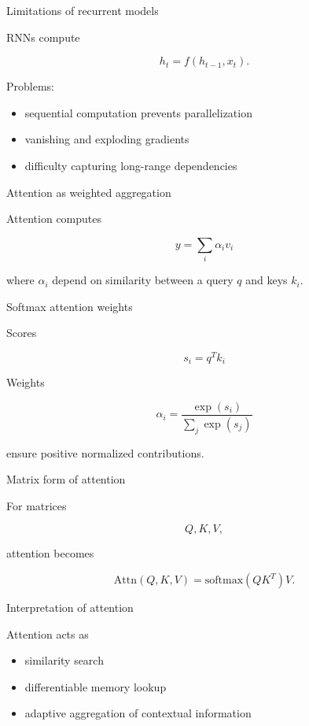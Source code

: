\documentclass[aspectratio=169]{beamer}
\begin{document}
\begin{frame}{Limitations of recurrent models}

RNNs compute

\[
h_t = f(h_{t-1},x_t).
\]

Problems:

\begin{itemize}
\item sequential computation prevents parallelization
\item vanishing and exploding gradients
\item difficulty capturing long-range dependencies
\end{itemize}

\end{frame}


\begin{frame}{Attention as weighted aggregation}

Attention computes

\[
y = \sum_i \alpha_i v_i
\]

where $\alpha_i$ depend on similarity between a query $q$
and keys $k_i$.

\end{frame}


\begin{frame}{Softmax attention weights}

Scores

\[
s_i = q^T k_i
\]

Weights

\[
\alpha_i = \frac{\exp(s_i)}{\sum_j \exp(s_j)}
\]

ensure positive normalized contributions.

\end{frame}


\begin{frame}{Matrix form of attention}

For matrices

\[
Q,K,V,
\]

attention becomes

\[
\text{Attn}(Q,K,V) = \text{softmax}(QK^T)V.
\]

\end{frame}


\begin{frame}{Interpretation of attention}

Attention acts as

\begin{itemize}
\item similarity search
\item differentiable memory lookup
\item adaptive aggregation of contextual information
\end{itemize}

\end{frame}
\end{document}
